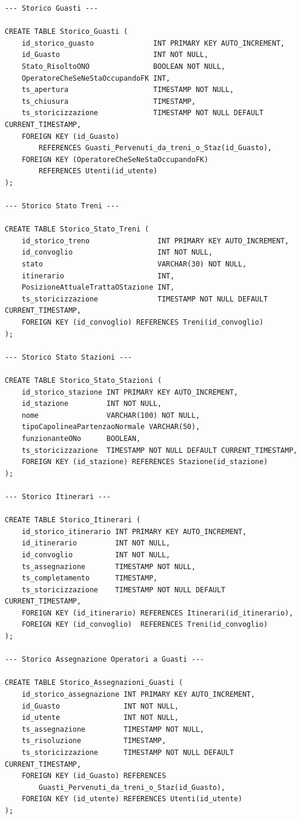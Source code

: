\documentclass[11pt]{article}
\begin{document}
\begin{verbatim}
--- Storico Guasti ---

CREATE TABLE Storico_Guasti (
    id_storico_guasto              INT PRIMARY KEY AUTO_INCREMENT,
    id_Guasto                      INT NOT NULL,
    Stato_RisoltoONO               BOOLEAN NOT NULL,
    OperatoreCheSeNeStaOccupandoFK INT,
    ts_apertura                    TIMESTAMP NOT NULL,
    ts_chiusura                    TIMESTAMP,
    ts_storicizzazione             TIMESTAMP NOT NULL DEFAULT CURRENT_TIMESTAMP,
    FOREIGN KEY (id_Guasto)
        REFERENCES Guasti_Pervenuti_da_treni_o_Staz(id_Guasto),
    FOREIGN KEY (OperatoreCheSeNeStaOccupandoFK)
        REFERENCES Utenti(id_utente)
);

--- Storico Stato Treni ---

CREATE TABLE Storico_Stato_Treni (
    id_storico_treno                INT PRIMARY KEY AUTO_INCREMENT,
    id_convoglio                    INT NOT NULL,
    stato                           VARCHAR(30) NOT NULL,
    itinerario                      INT,
    PosizioneAttualeTrattaOStazione INT,
    ts_storicizzazione              TIMESTAMP NOT NULL DEFAULT CURRENT_TIMESTAMP,
    FOREIGN KEY (id_convoglio) REFERENCES Treni(id_convoglio)
);

--- Storico Stato Stazioni ---

CREATE TABLE Storico_Stato_Stazioni (
    id_storico_stazione INT PRIMARY KEY AUTO_INCREMENT,
    id_stazione         INT NOT NULL,
    nome                VARCHAR(100) NOT NULL,
    tipoCapolineaPartenzaoNormale VARCHAR(50),
    funzionanteONo      BOOLEAN,
    ts_storicizzazione  TIMESTAMP NOT NULL DEFAULT CURRENT_TIMESTAMP,
    FOREIGN KEY (id_stazione) REFERENCES Stazione(id_stazione)
);

--- Storico Itinerari ---

CREATE TABLE Storico_Itinerari (
    id_storico_itinerario INT PRIMARY KEY AUTO_INCREMENT,
    id_itinerario         INT NOT NULL,
    id_convoglio          INT NOT NULL,
    ts_assegnazione       TIMESTAMP NOT NULL,
    ts_completamento      TIMESTAMP,
    ts_storicizzazione    TIMESTAMP NOT NULL DEFAULT CURRENT_TIMESTAMP,
    FOREIGN KEY (id_itinerario) REFERENCES Itinerari(id_itinerario),
    FOREIGN KEY (id_convoglio)  REFERENCES Treni(id_convoglio)
);

--- Storico Assegnazione Operatori a Guasti ---

CREATE TABLE Storico_Assegnazioni_Guasti (
    id_storico_assegnazione INT PRIMARY KEY AUTO_INCREMENT,
    id_Guasto               INT NOT NULL,
    id_utente               INT NOT NULL,
    ts_assegnazione         TIMESTAMP NOT NULL,
    ts_risoluzione          TIMESTAMP,
    ts_storicizzazione      TIMESTAMP NOT NULL DEFAULT CURRENT_TIMESTAMP,
    FOREIGN KEY (id_Guasto) REFERENCES
        Guasti_Pervenuti_da_treni_o_Staz(id_Guasto),
    FOREIGN KEY (id_utente) REFERENCES Utenti(id_utente)
);


\end{verbatim}
\end{document}
